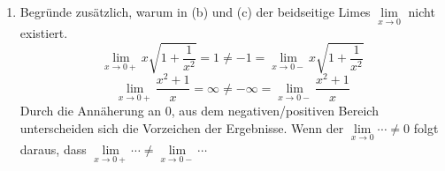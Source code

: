 \documentclass{HM}
\begin{document}
\begin{enumerate}
\begin{enumerate}
	\item Begründe zusätzlich, warum in (b) und (c) der beidseitige Limes $\lim\limits_{x\to0}$ nicht existiert.
	$$\lim\limits_{x\to0+}x\sqrt{1+\frac{1}{x^2}} = 1\not= -1 = \lim\limits_{x\to0-}x\sqrt{1+\frac{1}{x^2}}$$
	$$\lim\limits_{x\to0+}\frac{x^2+1}{x} = \infty\not= -\infty = \lim\limits_{x\to0-}\frac{x^2+1}{x}$$
	Durch die Annäherung an 0, aus dem negativen/positiven Bereich unterscheiden sich die Vorzeichen der Ergebnisse. Wenn der $\lim\limits_{x\to0}\cdots\not=0$ folgt daraus, dass $\lim\limits_{x\to0+}\cdots\not=\lim\limits_{x\to0-}\cdots$
\end{enumerate}
\end{enumerate}
\end{document}
